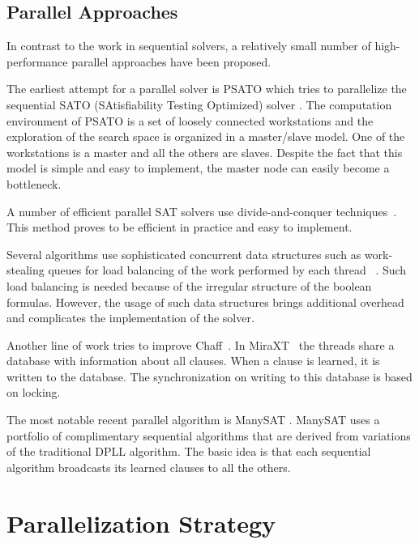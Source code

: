 \documentclass[letterpaper, compsoc, conference]{IEEEtran}
\begin{document}
\subsection{Parallel Approaches}
In contrast to the work in sequential solvers, a relatively small number of 
high-performance parallel approaches have been proposed.

\indent The earliest attempt for a parallel solver is PSATO \cite{PSATO} which tries
to parallelize the sequential SATO (SAtisfiability Testing Optimized) solver
\cite{Zhang94sato}. The computation environment of PSATO is a set of loosely connected 
workstations and the exploration of the search space is organized in a master/slave 
model. One of the workstations is a master and all the others are slaves. Despite 
the fact that this model is simple and easy to implement, the master node can easily 
become a bottleneck.

\indent A number of efficient parallel SAT solvers use divide-and-conquer 
techniques~\cite{PMiniSat, Bohm96, Lewis2007MiraXT, Gil08Pmsat}. This method
proves to be efficient in practice and easy to implement. 

\indent Several algorithms use sophisticated concurrent data structures such
as work-stealing queues for load balancing of the work performed by each thread
~\cite{Jurkowiak2005,PMiniSat}. Such load balancing is needed because of the 
irregular structure of the boolean formulas. However, the usage of such data 
structures brings additional overhead and complicates the implementation of the
solver.

\indent Another line of work tries to improve Chaff~\cite{Chrabakh03gradsat, 
Lewis2007MiraXT}. In MiraXT~\cite{Lewis2007MiraXT} the threads share a database with 
information about all clauses. When a clause is learned, it is written to the
database. The synchronization on writing to this database is based on locking.

\indent The most notable recent parallel algorithm is ManySAT \citep{ManySAT}.
ManySAT uses a portfolio of complimentary sequential algorithms that are derived
from variations of the traditional DPLL algorithm. The basic idea is that each 
sequential algorithm broadcasts its learned clauses to all the others.

\section{Parallelization Strategy}
\label{sec:strategy}
\end{document}
